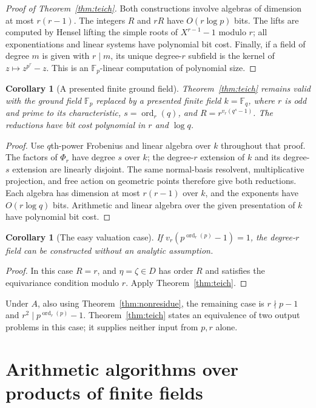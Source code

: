\documentclass[11pt]{article}
\newcommand{\F}{\mathbb F}
\newcommand{\ord}{\operatorname{ord}}
\newtheorem{corollary}[theorem]{Corollary}
\theoremstyle{definition}
\theoremstyle{remark}
\begin{document}
\begin{proof}[Proof of Theorem~\ref{thm:teich}]
Both constructions involve algebras of dimension at most
$r(r-1)$.  The integers $R$ and $rR$ have $O(r\log p)$
bits.  The lifts are computed by Hensel lifting the simple
roots of $X^{r-1}-1$ modulo $r$; all exponentiations and
linear systems have polynomial bit cost.  Finally, if a
field of degree $m$ is given with $r\mid m$, its unique
degree-$r$ subfield is the kernel of $z\mapsto z^{p^r}-z$.
This is an $\F_p$-linear computation of polynomial size.
\end{proof}

\begin{corollary}[A presented finite ground field]\label{cor:teich-basefield}
Theorem~\ref{thm:teich} remains valid with the ground field
$\F_p$ replaced by a presented finite field $k=\F_q$, where
$r$ is odd and prime to its characteristic, $s=\ord_r(q)$,
and $R=r^{v_r(q^s-1)}$. The reductions have bit cost polynomial
in $r$ and $\log q$.
\end{corollary}
\begin{proof}
Use $q$th-power Frobenius and linear algebra over $k$ throughout
that proof. The factors of $\Phi_r$ have degree $s$ over $k$;
the degree-$r$ extension of $k$ and its degree-$s$ extension are
linearly disjoint. The same normal-basis resolvent, multiplicative
projection, and free action on geometric points therefore give both
reductions. Each algebra has dimension at most $r(r-1)$ over $k$,
and the exponents have $O(r\log q)$ bits. Arithmetic and linear
algebra over the given presentation of $k$ have polynomial bit cost.
\end{proof}

\begin{corollary}[The easy valuation case]\label{cor:valuationone}
If $v_r(p^{\ord_r(p)}-1)=1$, the degree-$r$ field can be
constructed without an analytic assumption.
\end{corollary}
\begin{proof}
In this case $R=r$, and $\eta=\zeta\in D$ has order $R$
and satisfies the equivariance condition modulo $r$.
Apply Theorem~\ref{thm:teich}.
\end{proof}

Under $A$, also using Theorem~\ref{thm:nonresidue}, the remaining case is
$r\nmid p-1$ and $r^2\mid p^{\ord_r(p)}-1$.
Theorem~\ref{thm:teich} states an equivalence of two output
problems in this case; it supplies neither input from $p,r$ alone.

\section{Arithmetic algorithms over products of finite fields}
\label{sec:cm-etale-interface}
\end{document}
